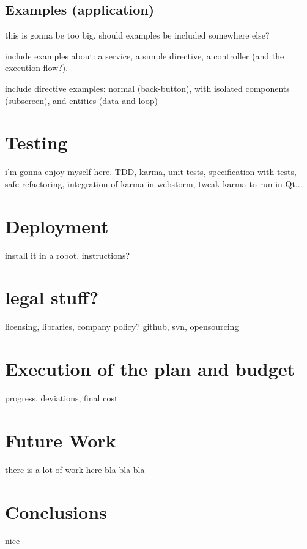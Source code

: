 \section{Examples (application)}
this is gonna be too big. should examples be included somewhere else?

include examples about: a service, a simple directive, a controller (and the execution flow?).

include directive examples: normal (back-button), with isolated components (subscreen), and entities (data and loop)

\chapter{Testing}
i'm gonna enjoy myself here.
TDD, karma, unit tests, specification with tests, safe refactoring, integration of karma in webstorm, tweak karma to run in Qt...

\chapter{Deployment}
install it in a robot. instructions?

\chapter{legal stuff?}
licensing, libraries, company policy? github, svn, opensourcing

\chapter{Execution of the plan and budget}
progress, deviations, final cost

\chapter{Future Work}
there is a lot of work here bla bla bla

\chapter{Conclusions}
nice

